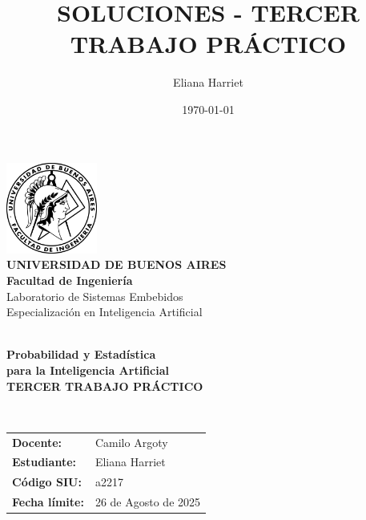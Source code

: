 \documentclass[11pt,a4paper]{article}
\title{SOLUCIONES - TERCER TRABAJO PRÁCTICO}
\author{Eliana Harriet}
\date{\today}
\begin{document}
\begin{titlepage}
    \centering
    
    \vspace*{0.5cm}
    
    \includegraphics[width=3cm]{../../assets/Logo-fiuba_big.png}\\[0.5cm]
    
    {\color{ubaazul}\Large \textbf{UNIVERSIDAD DE BUENOS AIRES}}\\[0.2cm]
    {\color{ubaazul}\large \textbf{Facultad de Ingeniería}}\\[0.1cm]
    {\color{ubagris}\normalsize Laboratorio de Sistemas Embebidos}\\[0.1cm]
    {\color{ubagris}\normalsize Especialización en Inteligencia Artificial}\\[0.3cm]
    
    \rule{0cm}{0.5pt}\\[0.5cm]
    
    {\color{ubaazul}\Large \textbf{Probabilidad y Estadística}}\\[0.2cm]
    {\color{ubaazul}\Large \textbf{para la Inteligencia Artificial}}\\[0.8cm]
    
    {\Large \textbf{TERCER TRABAJO PRÁCTICO}}\\[0.5cm]
    
    \rule{0cm}{0.5pt}\\[1cm]
    
    \begin{tabular}{@{}p{4cm}p{7cm}@{}}
        \textbf{Docente:} & Camilo Argoty \\[0.4cm]
        \textbf{Estudiante:} & Eliana Harriet \\[0.4cm]
        \textbf{Código SIU:} & a2217 \\[0.4cm]
        \textbf{Fecha límite:} & 26 de Agosto de 2025 \\[0.4cm]
    \end{tabular}
    
    \vfill
    
\end{titlepage}
\end{document}
